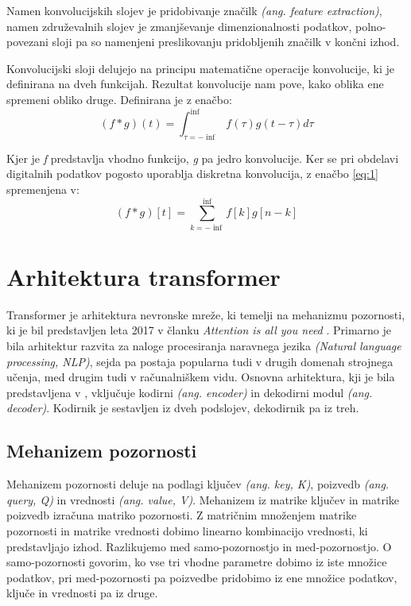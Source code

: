 \documentclass[a4paper,12pt,openright]{book}
\begin{document}
Namen konvolucijskih slojev je pridobivanje značilk \emph{(ang. feature extraction)}, namen združevalnih slojev je zmanjševanje dimenzionalnosti podatkov, polno-povezani sloji pa so namenjeni preslikovanju pridobljenih značilk v končni izhod.

Konvolucijski sloji delujejo na principu matematične operacije konvolucije, ki je definirana na dveh funkcijah. Rezultat konvolucije nam pove, kako oblika ene spremeni obliko druge. Definirana je z enačbo:
\begin{equation}
    (f*g)(t)=\int_{\tau=-\inf}^{\inf}f(\tau)g(t-\tau)d\tau
    \label{eq:1}
\end{equation}

Kjer je \emph{f} predstavlja vhodno funkcijo, \emph{g} pa jedro konvolucije. Ker se pri obdelavi digitalnih podatkov pogosto uporablja diskretna konvolucija, z enačbo \ref{eq:1} spremenjena v:
\begin{equation}
    (f*g)[t]=\sum_{k=-\inf}^{\inf}f[k]g[n - k]
    \label{eq:2}
\end{equation}

\section{Arhitektura transformer}
Transformer je arhitektura nevronske mreže, ki temelji na mehanizmu pozornosti, ki je bil predstavljen leta 2017 v članku \emph{Attention is all you need} \cite{attention_is_all_you_need}. Primarno je bila arhitektur razvita za naloge procesiranja naravnega jezika \emph{(Natural language processing, NLP)}, sejda pa postaja popularna tudi v drugih domenah strojnega učenja, med drugim tudi v računalniškem vidu. Osnovna arhitektura, kji je bila predstavljena v \cite{attention_is_all_you_need}, vključuje kodirni \emph{(ang. encoder)} in dekodirni modul \emph{(ang. decoder)}. Kodirnik je sestavljen iz dveh podslojev, dekodirnik pa iz treh.

\subsection{Mehanizem pozornosti}
Mehanizem pozornosti deluje na podlagi ključev \emph{(ang. key, K)}, poizvedb \emph{(ang. query, Q)} in vrednosti \emph{(ang. value, V)}. Mehanizem iz matrike ključev in matrike poizvedb izračuna matriko pozornosti. Z matričnim množenjem matrike pozornosti in matrike vrednosti dobimo linearno kombinacijo vrednosti, ki predstavljajo izhod. Razlikujemo med samo-pozornostjo in med-pozornostjo. O samo-pozornosti govorim, ko vse tri vhodne parametre dobimo iz iste množice podatkov, pri med-pozornosti pa poizvedbe pridobimo iz ene množice podatkov, ključe in vrednosti pa iz druge.
\end{document}
